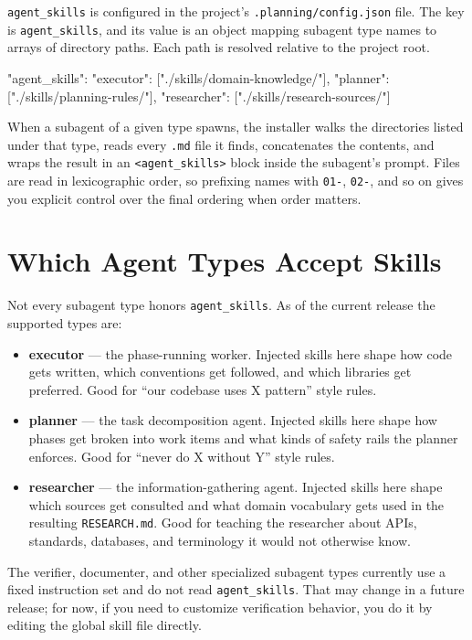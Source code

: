 \documentclass[11pt,letterpaper,openany]{book}
\begin{document}
\texttt{agent\_skills} is configured in the project's
\texttt{.planning/config.json} file. The key is \texttt{agent\_skills},
and its value is an object mapping subagent type names to arrays of
directory paths. Each path is resolved relative to the project root.

\begin{gsdjson}
{
  "agent_skills": {
    "executor": ["./skills/domain-knowledge/"],
    "planner": ["./skills/planning-rules/"],
    "researcher": ["./skills/research-sources/"]
  }
}
\end{gsdjson}

When a subagent of a given type spawns, the installer walks the
directories listed under that type, reads every \texttt{.md} file it
finds, concatenates the contents, and wraps the result in an
\texttt{<agent\_skills>} block inside the subagent's prompt. Files are
read in lexicographic order, so prefixing names with \texttt{01-},
\texttt{02-}, and so on gives you explicit control over the final
ordering when order matters.

\section{Which Agent Types Accept Skills}

Not every subagent type honors \texttt{agent\_skills}. As of the current
release the supported types are:

\begin{itemize}
\item \textbf{executor} --- the phase-running worker. Injected skills
here shape how code gets written, which conventions get followed, and
which libraries get preferred. Good for ``our codebase uses X pattern''
style rules.
\item \textbf{planner} --- the task decomposition agent. Injected skills
here shape how phases get broken into work items and what kinds of
safety rails the planner enforces. Good for ``never do X without Y''
style rules.
\item \textbf{researcher} --- the information-gathering agent. Injected
skills here shape which sources get consulted and what domain
vocabulary gets used in the resulting \texttt{RESEARCH.md}. Good for
teaching the researcher about APIs, standards, databases, and
terminology it would not otherwise know.
\end{itemize}

The verifier, documenter, and other specialized subagent types currently
use a fixed instruction set and do not read \texttt{agent\_skills}. That
may change in a future release; for now, if you need to customize
verification behavior, you do it by editing the global skill file
directly.
\end{document}
